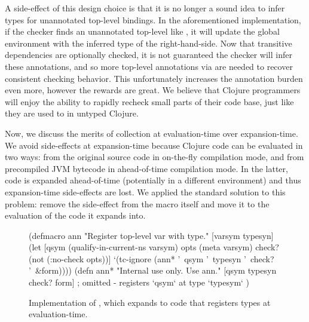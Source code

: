 A side-effect of this design choice is that it is no longer a sound idea to
infer types for unannotated top-level bindings. In the aforementioned 
implementation, if the checker finds an unannotated top-level 
like , it will update the global environment with the 
inferred type of the right-hand-side.
Now that transitive dependencies are optionally checked, it is not guaranteed
the checker will infer these annotations, and so more top-level annotations
via  are needed to recover consistent checking behavior.
This unfortunately increases the annotation burden even more, however the rewards
are great.
We believe that Clojure programmers will enjoy the ability to rapidly recheck
small parts of their code base, just like they are used to in untyped Clojure.

Now, we discuss the merits of collection at evaluation-time over expansion-time.
We avoid side-effects at expansion-time because Clojure code can be
evaluated in two ways: from the original source code in on-the-fly compilation mode, and 
from precompiled JVM bytecode in ahead-of-time compilation mode.
In the latter, code is expanded ahead-of-time (potentially in a different environment)
and thus expansion-time side-effects are lost.
We applied the standard solution to this problem: remove the side-effect from
the macro itself and move it to the evaluation of the code it expands into.




\begin{figure*}
\begin{cljlisting}
(defmacro ann 
  "Register top-level var with type."
  [varsym typesyn]
  (let [qsym (qualify-in-current-ns varsym)
        opts (meta varsym)
        check? (not (:no-check opts))]
    `(tc-ignore (ann* '~qsym '~typesyn '~check? '~&form))))
(defn ann* 
  "Internal use only. Use ann."
  [qsym typesyn check? form]
  ; omitted - registers `qsym` at type `typesym`
  )
\end{cljlisting}
  \caption{Implementation of , which expands to code that registers types at evaluation-time.}
  \label{fig:analyzer:ann-definition}
\end{figure*}

